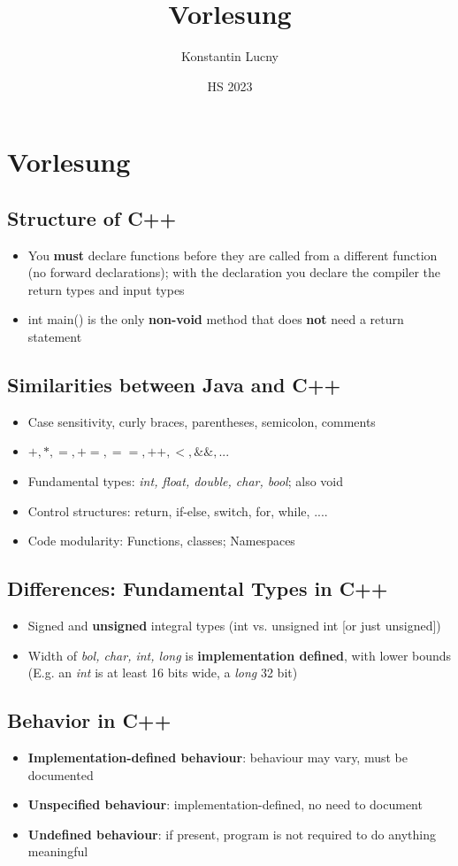 \documentclass[a4paper,10pt]{article}
\title{Vorlesung}
\author{Konstantin Lucny}
\date{HS 2023}
\begin{document}
\maketitle
\section{Vorlesung}
\subsection{Structure of C++}
\begin{itemize}
    \item You \textbf{must} declare functions before they are called from a different function (no forward declarations); with the declaration you declare the compiler the return types and input types
    \item int main() is the only \textbf{non-void} method that does \textbf{not} need a return statement  
\end{itemize}
\subsection{Similarities between Java and C++}
\begin{itemize}
    \item Case sensitivity, curly braces, parentheses, semicolon, comments
    \item $+,*,=,+=,==,++,<,\&\&,...$
    \item Fundamental types: \textit{int, float, double, char, bool}; also void
    \item Control structures: return, if-else, switch, for, while, ....
    \item Code modularity: Functions, classes; Namespaces
\end{itemize}
\subsection{Differences: Fundamental Types in C++}
\begin{itemize}
    \item Signed and \textbf{unsigned} integral types (int vs. unsigned int [or just unsigned])
    \item Width of \textit{bol, char, int, long} is \textbf{implementation defined}, with lower bounds (E.g. an \textit{int} is at least 16 bits wide, a \textit{long} 32 bit)
\end{itemize}
\subsection{Behavior in C++}
\begin{itemize}
    \item \textbf{Implementation-defined behaviour}: behaviour may vary, must be documented
    \item \textbf{Unspecified behaviour}: implementation-defined, no need to document
    \item \textbf{Undefined behaviour}: if present, program is not required to do anything meaningful
\end{itemize}
\end{document}
